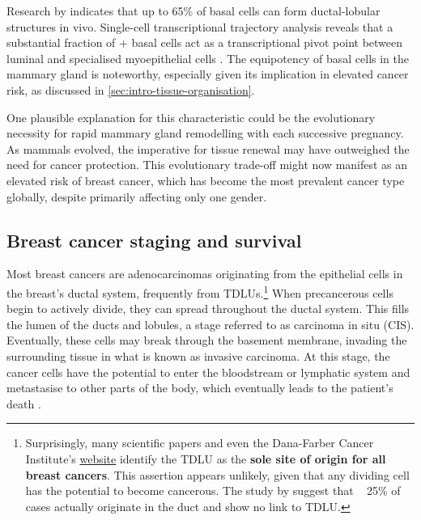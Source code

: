 
Research by \textcite{Prater2014-qd} indicates that up to 65\% of basal cells can form ductal-lobular structures in vivo. Single-cell transcriptional trajectory analysis reveals that a substantial fraction of + basal cells act as a transcriptional pivot point between luminal and specialised myoepithelial cells \parencite{Nguyen2018-jl}. The equipotency of basal cells in the mammary gland is noteworthy, especially given its implication in elevated cancer risk, as discussed in \cref{sec:intro-tissue-organisation}.

One plausible explanation for this characteristic could be the evolutionary necessity for rapid mammary gland remodelling with each successive pregnancy. As mammals evolved, the imperative for tissue renewal may have outweighed the need for cancer protection. This evolutionary trade-off might now manifest as an elevated risk of breast cancer, which has become the most prevalent cancer type globally, despite primarily affecting only one gender.

\subsection{Breast cancer staging and survival}

Most breast cancers are adenocarcinomas originating from the epithelial cells in the breast's ductal system, frequently from \acp{TDLU}.\footnote{Surprisingly, many scientific papers and even the Dana-Farber Cancer Institute's \href{https://www.dana-farber.org/health-library/articles/what-is-lobular-breast-cancer-}{website} identify the \ac{TDLU} as the  \textbf{sole site of origin for all breast cancers}. This assertion appears unlikely, given that any dividing cell has the potential to become cancerous. The study by \textcite{Tabar2014-ea} suggest that ~ 25\% of cases actually originate in the duct and show no link to \ac{TDLU}.} When precancerous cells begin to actively divide, they can spread throughout the ductal system. This fills the lumen of the ducts and lobules, a stage referred to as carcinoma in situ (CIS). Eventually, these cells may break through the basement membrane, invading the surrounding tissue in what is known as invasive carcinoma. At this stage, the cancer cells have the potential to enter the bloodstream or lymphatic system and metastasise to other parts of the body, which eventually leads to the patient's death .

